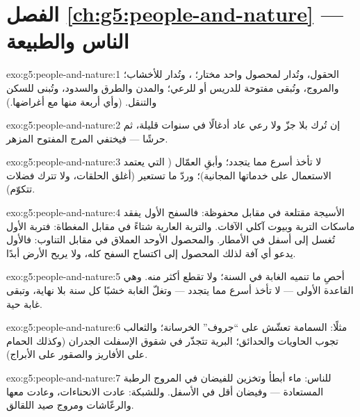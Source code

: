 \section*{الفصل \ref{ch:g5:people-and-nature} --- الناس والطبيعة}

\begin{solution}{exo:g5:people-and-nature:1}
الحقول، وتُدار لمحصول واحد مختار؛ ، وتُدار للأخشاب؛
والمروج، وتُبقى مفتوحة للدريس أو للرعي؛ والمدن والطرق والسدود،
وتُبنى للسكن والتنقل. (وأي أربعة منها مع أغراضها.)
\end{solution}

\begin{solution}{exo:g5:people-and-nature:2}
إن تُرك بلا جزّ ولا رعي عاد أدغالًا في سنوات قليلة، ثم حرشًا ---
فيختفي  المرج المفتوح المزهر.
\end{solution}

\begin{solution}{exo:g5:people-and-nature:3}
لا تأخذ أسرع مما يتجدد؛ وأبقِ العمّال ( التي يعتمد
الاستعمال على خدماتها المجانية)؛ وردّ ما تستعير (أغلق الحلقات، ولا
تترك فضلات تتكوّم).
\end{solution}

\begin{solution}{exo:g5:people-and-nature:4}
الأسيجة مقتلعة في مقابل محفوظة: فالسفح الأول يفقد ماسكات التربة
وبيوت آكلي الآفات. والتربة العارية شتاءً في مقابل المغطاة: فتربة
الأول تُغسل إلى أسفل في الأمطار. والمحصول الأوحد العملاق في مقابل
التناوب: فالأول يدعو أي آفة لذلك المحصول إلى اكتساح السفح كله، ولا
يريح الأرض أبدًا.
\end{solution}

\begin{solution}{exo:g5:people-and-nature:5}
أحصِ ما تنميه الغابة في السنة؛ ولا تقطع أكثر منه. وهي القاعدة
الأولى --- لا تأخذ أسرع مما يتجدد --- وتغلّ الغابة خشبًا كل سنة بلا
نهاية، وتبقى غابة حية.
\end{solution}

\begin{solution}{exo:g5:people-and-nature:6}
مثلًا: السمامة تعشّش على ``جروف'' الخرسانة؛ والثعالب تجوب
الحاويات والحدائق؛  البرية تتجذّر في شقوق الإسفلت
 الجدران (وكذلك الحمام على الأفاريز والصقور على الأبراج).
\end{solution}

\begin{solution}{exo:g5:people-and-nature:7}
للناس: ماء أبطأ وتخزين للفيضان في المروج الرطبة المستعادة ---
وفيضان أقل في الأسفل. وللشبكة: عادت  الانحناءات، وعادت معها
 والرعّاشات ومروج صيد اللقالق.
\end{solution}

